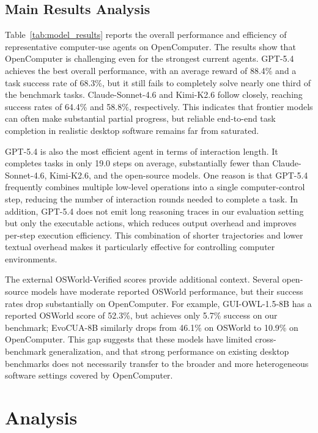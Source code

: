 \documentclass{llmxive}
\providecommand{\ours}{OpenComputer\xspace}
\begin{document}
\subsection{Main Results Analysis}

Table~\ref{tab:model_results} reports the overall performance and efficiency of representative 
computer-use agents on OpenComputer. The results show that OpenComputer is challenging even
for the strongest current agents. GPT-5.4 achieves the best overall performance, with an average
reward of 88.4\% and a task success rate of 68.3\%, but it still fails to completely solve nearly one
third of the benchmark tasks. Claude-Sonnet-4.6 and Kimi-K2.6 follow closely, reaching success
rates of 64.4\% and 58.8\%, respectively. This indicates that frontier models can often make
substantial partial progress, but reliable end-to-end task completion in realistic desktop software
remains far from saturated.

GPT-5.4 is also the most efficient agent in terms of interaction length. It completes tasks in only
19.0 steps on average, substantially fewer than Claude-Sonnet-4.6, Kimi-K2.6, and the open-source
models. One reason is that GPT-5.4 frequently combines multiple low-level operations into a single
computer-control step, reducing the number of interaction rounds needed to complete a task. In
addition, GPT-5.4 does not emit long reasoning traces in our evaluation setting but only the executable actions, which reduces output overhead and improves per-step execution efficiency. This combination of shorter trajectories
and lower textual overhead makes it particularly effective for controlling computer environments.

The external OSWorld-Verified scores provide additional context. Several open-source models have moderate reported OSWorld performance, but their success rates drop substantially on OpenComputer.
For example, GUI-OWL-1.5-8B has a reported OSWorld score of 52.3\%, but achieves only 5.7\%
success on our benchmark; EvoCUA-8B similarly drops from 46.1\% on OSWorld to 10.9\% on
\ours. This gap suggests that these models have limited cross-benchmark generalization,
and that strong performance on existing desktop benchmarks does not necessarily transfer to the
broader and more heterogeneous software settings covered by \ours.

\section{Analysis}
\label{sec:analysis}
\end{document}
